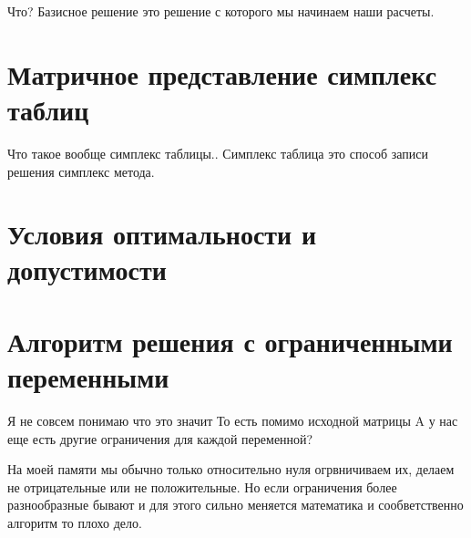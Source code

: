 \documentclass[a4paper,article,14pt]{extarticle}
\begin{document}
Что?
Базисное решение это решение с которого мы начинаем наши расчеты.

\section{Матричное представление симплекс таблиц}

Что такое вообще симплекс таблицы..
Симплекс таблица это способ записи решения симплекс метода.

\section{Условия оптимальности и допустимости}

\section{Алгоритм решения с ограниченными переменными}

Я не совсем понимаю что это значит
То есть помимо исходной матрицы A у нас еще есть другие ограничения для каждой переменной?

На моей памяти мы обычно только относительно нуля огрвничиваем их, делаем не отрицательные или не положительные.
Но если ограничения более разнообразные бывают и для этого сильно меняется математика и сообветственно алгоритм то плохо дело.
\end{document}
